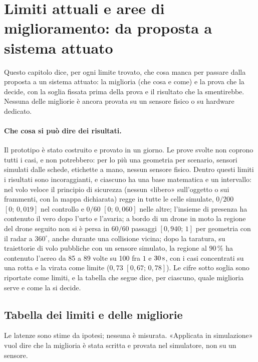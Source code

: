 \section{Limiti attuali e aree di miglioramento: da proposta a sistema attuato}\label{sec:ps}

Questo capitolo dice, per ogni limite trovato, che cosa manca per passare dalla proposta a un sistema attuato: la miglioria (che cosa e come) e la prova che la decide, con la soglia fissata prima della prova e il risultato che la smentirebbe. Nessuna delle migliorie è ancora provata su un sensore fisico o su hardware dedicato.

\paragraph{Che cosa si può dire dei risultati.} Il prototipo è stato costruito e provato in un giorno. Le prove svolte non coprono tutti i casi, e non potrebbero: per lo più una geometria per scenario, sensori simulati dalle schede, etichette a mano, nessun sensore fisico. Dentro questi limiti i risultati sono incoraggianti, e ciascuno ha una base matematica e un intervallo: nel volo veloce il principio di sicurezza (nessun «libero» sull'oggetto o sui frammenti, con la mappa dichiarata) regge in tutte le celle simulate, $0/200$ $[0;\,0{,}019]$ nel controllo e $0/60$ $[0;\,0{,}060]$ nelle altre; l'insieme di presenza ha contenuto il vero dopo l'urto e l'avaria; a bordo di un drone in moto la regione del drone seguito non si è persa in $60/60$ passaggi $[0{,}940;\,1]$ per geometria con il radar a $360^\circ$, anche durante una collisione vicina; dopo la taratura, su traiettorie di volo pubbliche con un sensore simulato, la regione al $90\,\%$ ha contenuto l'aereo da 85 a 89 volte su 100 fra $1$ e $30\,\mathrm{s}$, con i casi concentrati su una rotta e la virata come limite ($0{,}73$ $[0{,}67;\,0{,}78]$). Le cifre sotto soglia sono riportate come limiti, e la tabella che segue dice, per ciascuno, quale miglioria serve e come la si decide.

\subsection{Tabella dei limiti e delle migliorie}\label{sec:ps-tabella}

Le latenze sono stime da ipotesi; nessuna è misurata. «Applicata in simulazione» vuol dire che la miglioria è stata scritta e provata nel simulatore, non su un sensore.

